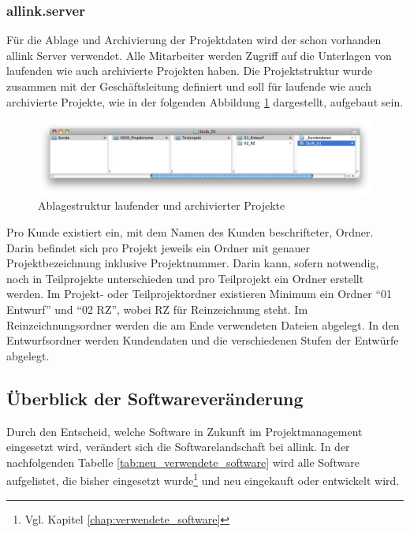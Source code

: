 \subsubsection{allink.server}
Für die Ablage und Archivierung der Projektdaten wird der schon vorhanden
allink Server verwendet. Alle Mitarbeiter werden Zugriff auf die Unterlagen
von laufenden wie auch archivierte Projekten haben. Die Projektstruktur
wurde zusammen mit der Geschäftsleitung definiert und soll für laufende
wie auch archivierte Projekte, wie in der folgenden Abbildung \ref{pic:05_ablagestruktur} 
dargestellt, aufgebaut sein.

\begin{figure}[htbp]
\begin{center}
\includegraphics[width=1.0\textwidth,angle=0]{./bilder/loesung/05_ablagestruktur.png}
\caption[Ablagestruktur laufender und archivierter Projekte]{Ablagestruktur 
    laufender und archivierter Projekte\footnotemark}
\label{pic:05_ablagestruktur}
\end{center}
\end{figure}

Pro Kunde existiert ein, mit dem Namen des Kunden beschrifteter, Ordner. Darin befindet
sich pro Projekt jeweils ein Ordner mit genauer Projektbezeichnung inklusive Projektnummer.
Darin kann, sofern notwendig, noch in Teilprojekte unterschieden und
pro Teilprojekt ein Ordner erstellt werden. Im Projekt- oder Teilprojektordner
existieren Minimum ein Ordner ``01 Entwurf'' und ``02 RZ'', wobei RZ für Reinzeichnung
steht. Im Reinzeichnungsordner werden die am Ende verwendeten Dateien abgelegt.
In den Entwurfsordner werden Kundendaten und die verschiedenen Stufen der Entwürfe
abgelegt.

\subsection{Überblick der Softwareveränderung}
Durch den Entscheid, welche Software in Zukunft im Projektmanagement eingesetzt
wird, verändert sich die Softwarelandschaft bei allink. In der nachfolgenden
Tabelle \ref{tab:neu_verwendete_software} wird alle Software aufgelistet, die 
bisher eingesetzt wurde\footnote{Vgl. Kapitel \ref{chap:verwendete_software}} 
und neu eingekauft oder entwickelt wird.

